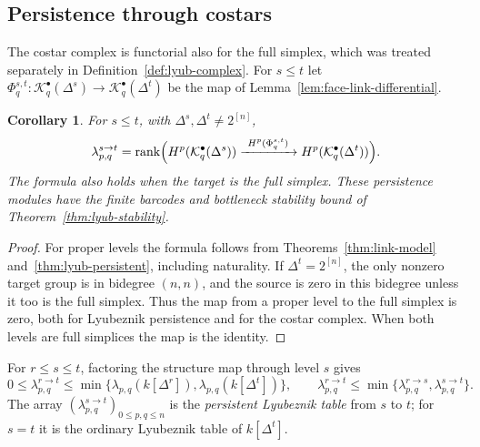\documentclass[11pt]{article}
\theoremstyle{plain}
\newtheorem{corollary}[theorem]{Corollary}
\theoremstyle{definition}
\newcommand{\kk}{k}
\newcommand{\rank}{\operatorname{rank}}
\newcommand{\Kc}{\mathcal K}
\begin{document}
\subsection{Persistence through costars}\label{ssec:costar-persistence}

The costar complex is functorial also for the full simplex, which was treated separately in Definition~\ref{def:lyub-complex}. For $s\le t$ let $\Phi_q^{s,t}:\Kc_q^\bullet(\Delta^s)\to\Kc_q^\bullet(\Delta^t)$ be the map of Lemma~\ref{lem:face-link-differential}.

\begin{corollary}\label{cor:costar-persistent}
For $s\le t$, with $\Delta^s,\Delta^t\ne2^{[n]}$,
\[
\lambda_{p,q}^{s\to t}=\rank\Bigl(H^p(\Kc_q^\bullet(\Delta^s))
\xrightarrow{\ H^p(\Phi_q^{s,t})\ }H^p(\Kc_q^\bullet(\Delta^t))\Bigr).
\]
The formula also holds when the target is the full simplex. These persistence modules have the finite barcodes and bottleneck stability bound of Theorem~\ref{thm:lyub-stability}.
\end{corollary}

\begin{proof}
For proper levels the formula follows from Theorems~\ref{thm:link-model} and~\ref{thm:lyub-persistent}, including naturality. If $\Delta^t=2^{[n]}$, the only nonzero target group is in bidegree $(n,n)$, and the source is zero in this bidegree unless it too is the full simplex. Thus the map from a proper level to the full simplex is zero, both for Lyubeznik persistence and for the costar complex. When both levels are full simplices the map is the identity.
\end{proof}

For $r\le s\le t$, factoring the structure map through level $s$ gives
\[
0\le\lambda_{p,q}^{r\to t}\le\min\{\lambda_{p,q}(\kk[\Delta^r]),\lambda_{p,q}(\kk[\Delta^t])\},\qquad
\lambda_{p,q}^{r\to t}\le\min\{\lambda_{p,q}^{r\to s},\lambda_{p,q}^{s\to t}\}.
\]
The array $(\lambda_{p,q}^{s\to t})_{0\le p,q\le n}$ is the \emph{persistent Lyubeznik table} from $s$ to $t$; for $s=t$ it is the ordinary Lyubeznik table of $\kk[\Delta^t]$.
\end{document}
